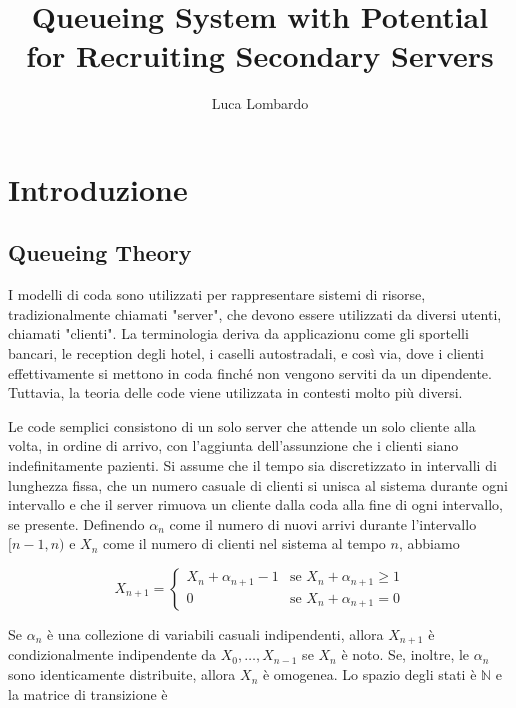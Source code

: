 \documentclass[11pt]{article}
\title{Queueing System with Potential for Recruiting Secondary Servers}
\author{Luca Lombardo}
\date{}
\newcommand{\N}{\mathbb{N}}
\begin{document}
\maketitle
\tableofcontents

\section{Introduzione}



\subsection{Queueing Theory}

I modelli di coda sono utilizzati per rappresentare sistemi di risorse, tradizionalmente chiamati "server", che devono essere utilizzati da diversi utenti, chiamati "clienti". La terminologia deriva da applicazionu come gli sportelli bancari, le reception degli hotel, i caselli autostradali, e così via, dove i clienti effettivamente si mettono in coda finché non vengono serviti da un dipendente. Tuttavia, la teoria delle code viene utilizzata in contesti molto più diversi. \vspace*{0.4cm}

\noindent Le code semplici consistono di un solo server che attende un solo cliente alla volta, in ordine di arrivo, con l'aggiunta dell'assunzione che i clienti siano indefinitamente pazienti. Si assume che il tempo sia discretizzato in intervalli di lunghezza fissa, che un numero casuale di clienti si unisca al sistema durante ogni intervallo e che il server rimuova un cliente dalla coda alla fine di ogni intervallo, se presente. Definendo $\alpha_n$ come il numero di nuovi arrivi durante l'intervallo $[n - 1, n)$ e $X_n$ come il numero di clienti nel sistema al tempo $n$, abbiamo

\begin{equation}
    X_{n+1} =
    \begin{cases}
        X_n + \alpha_{n+1} - 1 & \text{se } X_n + \alpha_{n+1} \geq 1 \\
        0 & \text{se } X_n + \alpha_{n+1} = 0
    \end{cases}
\end{equation}

\noindent Se ${\alpha_n}$ è una collezione di variabili casuali indipendenti, allora $X_{n+1}$ è condizionalmente indipendente da $X_0, \ldots, X_{n-1}$ se $X_n$ è noto. Se, inoltre, le $\alpha_n$ sono identicamente distribuite, allora ${X_n}$ è omogenea. Lo spazio degli stati è $\N$ e la matrice di transizione è
\end{document}
